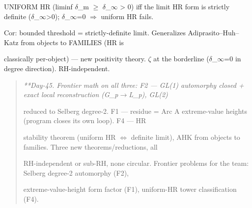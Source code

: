 \documentclass[10pt]{article}
\begin{document}
  UNIFORM HR (liminf \ensuremath{\delta}\_m \ensuremath{\ge} \ensuremath{\delta}\_\ensuremath{\infty} > 0) iff the limit HR form is strictly definite (\ensuremath{\delta}\_\ensuremath{\infty}>0); \ensuremath{\delta}\_\ensuremath{\infty}=0 \ensuremath{\Rightarrow} uniform HR fails.\par
  Cor: bounded threshold = strictly-definite limit. Generalizes Adiprasito--Huh--Katz from objects to FAMILIES (HR is\par
  classically per-object) --- new positivity theory. \ensuremath{\zeta} at the borderline (\ensuremath{\delta}\_\ensuremath{\infty}=0 in degree direction). RH-independent.\par

\begin{quote}\itshape
**Day-45. Frontier math on all three: F2 --- GL(1) automorphy closed + exact local reconstruction (G\_p\ensuremath{\to}L\_p), GL(2)\par
reduced to Selberg degree-2. F1 --- residue = Arc A extreme-value heights (program closes its own loop). F4 --- HR\par
stability theorem (uniform HR \ensuremath{\iff} definite limit), AHK from objects to families. Three new theorems/reductions, all\par
RH-independent or sub-RH, none circular. Frontier problems for the team: Selberg degree-2 automorphy (F2),\par
extreme-value-height form factor (F1), uniform-HR tower classification (F4).\par
\end{quote}
\end{document}
